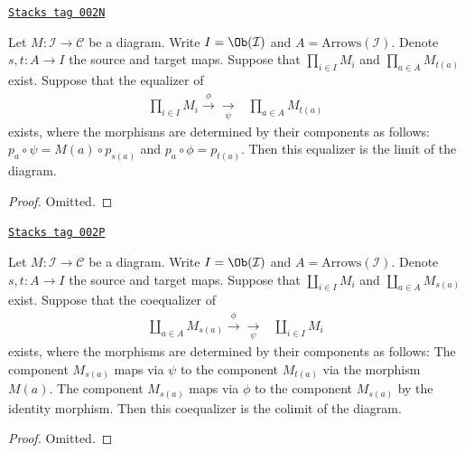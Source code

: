\begin{lemma}
\label{categories-lemma-limits-products-equalizers}
\href{https://stacks.math.columbia.edu/tag/002N}{\texttt{Stacks tag 002N}}

Let $M : \mathcal{I} \to \mathcal{C}$ be a diagram.
Write $I = \Ob(\mathcal{I})$ and $A = \text{Arrows}(\mathcal{I})$.
Denote $s, t : A \to I$ the source and target maps.
Suppose that $\prod_{i \in I} M_i$ and $\prod_{a \in A} M_{t(a)}$
exist. Suppose that the equalizer of
$$
\begin{array}{cc}\prod_{i \in I} M_i
\overset{\phi}{\longrightarrow}\underset{\psi}{\longrightarrow} & \prod_{a \in A} M_{t(a)}\end{array}
$$
exists, where the morphisms are determined by their components
as follows: $p_a \circ \psi = M(a) \circ p_{s(a)}$
and $p_a \circ \phi = p_{t(a)}$. Then this equalizer is the
limit of the diagram.
\end{lemma}

\begin{proof}
Omitted.
\end{proof}


\begin{lemma}
\label{categories-lemma-colimits-coproducts-coequalizers}
\href{https://stacks.math.columbia.edu/tag/002P}{\texttt{Stacks tag 002P}}


Let $M : \mathcal{I} \to \mathcal{C}$ be a diagram.
Write $I = \Ob(\mathcal{I})$ and $A = \text{Arrows}(\mathcal{I})$.
Denote $s, t : A \to I$ the source and target maps.
Suppose that $\coprod_{i \in I} M_i$ and $\coprod_{a \in A} M_{s(a)}$
exist. Suppose that the coequalizer of
$$
\begin{array}{cc}\coprod_{a \in A} M_{s(a)}
\overset{\phi}{\longrightarrow}\underset{\psi}{\longrightarrow} & \coprod_{i \in I} M_i\end{array}
$$
exists, where the morphisms are determined by their components
as follows: The component $M_{s(a)}$ maps via $\psi$
to the component $M_{t(a)}$ via the morphism $M(a)$.
The component $M_{s(a)}$ maps via $\phi$ to the component
$M_{s(a)}$ by the identity morphism. Then this coequalizer is the
colimit of the diagram.
\end{lemma}

\begin{proof}
Omitted.
\end{proof}

